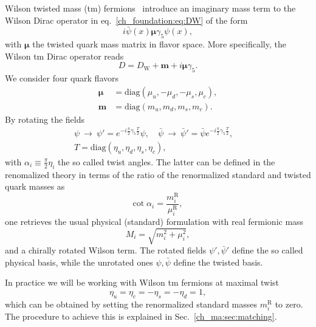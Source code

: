 Wilson twisted mass (tm) fermions~\citep{Frezzotti:1999vv,Frezzotti:2000nk,Frezzotti:2001ea,Frezzotti:2003ni,Shindler:2007vp} introduce an imaginary mass term to the Wilson Dirac operator in eq.~\eqref{ch_foundation:eq:DW} of the form
\begin{equation}
i\bar{\psi}(x)\boldsymbol{\mu}\gamma_5\psi(x),
\end{equation}
with $\boldsymbol{\mu}$ the twisted quark mass matrix in flavor space. More specifically, the Wilson tm Dirac operator reads
\begin{equation}
D=D_{\textrm{W}}+\boldsymbol{m}+i\boldsymbol{\mu}\gamma_5.
\end{equation}
We consider four quark flavors
\begin{align}
\boldsymbol{\mu}&={\textrm{diag}}\left(\mu_u,-\mu_d,-\mu_s,\mu_c\right), \\
\boldsymbol{m}&={\textrm{diag}}\left(m_u,m_d,m_s,m_c\right).
\end{align}
By rotating the fields
\begin{gather}
\label{ch_foundation:eq:chiral_rot}
\psi~\to~\psi' = e^{-i\frac{\pi}{2}\gamma_5 \frac{T}{2}}\psi, \quad
\bar{\psi}~\to~\bar{\psi}' = \bar{\psi} e^{-i\frac{\pi}{2}\gamma_5 \frac{T}{2}}, \quad \\
T = {\textrm{diag}}(\eta_u,\eta_d,\eta_s,\eta_c),
\end{gather}
with $\alpha_i\equiv\frac{\pi}{2}\eta_i$ the so called twist angles. The latter can be defined in the renomalized theory in terms of the ratio of the renormalized standard and twisted quark masses as
\begin{equation}
{\textrm{cot}}\;\alpha_i=\frac{m_i^{\textrm{R}}}{\mu_i^{\textrm{R}}},
\end{equation}
one retrieves the usual physical (standard) formulation with real fermionic mass
\begin{equation}
M_i=\sqrt{m_i^2+\mu_i^2},
\end{equation}
and a chirally rotated Wilson term. The rotated fields $\psi',\bar{\psi}'$ define the so called physical basis, while the unrotated ones $\psi,\bar{\psi}$ define the twisted basis.

In practice we will be working with Wilson tm fermions at maximal twist
\begin{equation}
\label{ch_foundation:eq:mte}
\eta_u=\eta_c=-\eta_s=-\eta_d=1,
\end{equation}
which can be obtained by setting the renormalized standard masses $m_i^{\textrm{R}}$ to zero. The procedure to achieve this is explained in Sec.~\ref{ch_ma:sec:matching}.


